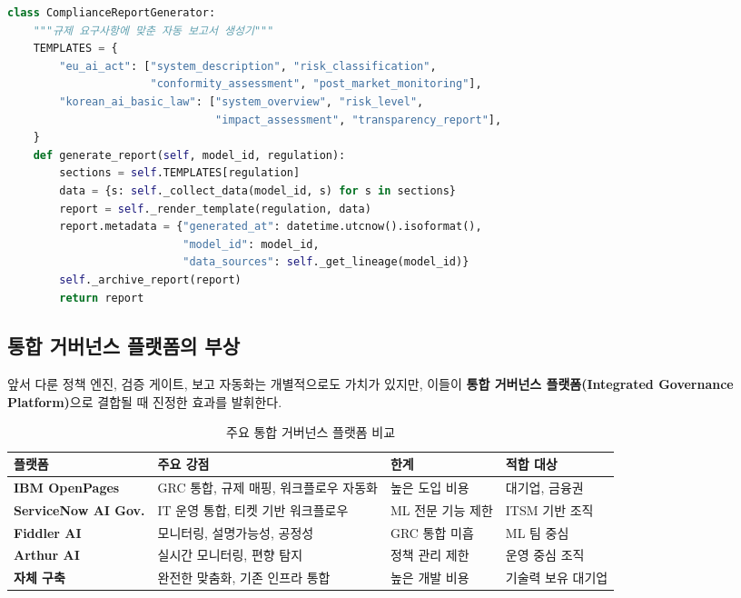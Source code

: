 \begin{lstlisting}[language=Python, caption={규정 준수 보고서 자동 생성기}, label={lst:compliance_report}]
class ComplianceReportGenerator:
    """규제 요구사항에 맞춘 자동 보고서 생성기"""
    TEMPLATES = {
        "eu_ai_act": ["system_description", "risk_classification",
                      "conformity_assessment", "post_market_monitoring"],
        "korean_ai_basic_law": ["system_overview", "risk_level",
                                "impact_assessment", "transparency_report"],
    }
    def generate_report(self, model_id, regulation):
        sections = self.TEMPLATES[regulation]
        data = {s: self._collect_data(model_id, s) for s in sections}
        report = self._render_template(regulation, data)
        report.metadata = {"generated_at": datetime.utcnow().isoformat(),
                           "model_id": model_id,
                           "data_sources": self._get_lineage(model_id)}
        self._archive_report(report)
        return report
\end{lstlisting}

\subsection{통합 거버넌스 플랫폼의 부상}
\label{sec:14.4.4}

앞서 다룬 정책 엔진, 검증 게이트, 보고 자동화는 개별적으로도 가치가 있지만, 이들이 \textbf{통합 거버넌스 플랫폼(Integrated Governance Platform)}으로 결합될 때 진정한 효과를 발휘한다\cite{shankar2022operationalizing}.

\begin{table}[htbp]
\centering
\caption{주요 통합 거버넌스 플랫폼 비교}
\label{tab:14_platforms}
\begin{tabularx}{\textwidth}{lXXl}
\toprule
\textbf{플랫폼} & \textbf{주요 강점} & \textbf{한계} & \textbf{적합 대상} \\
\midrule
\textbf{IBM OpenPages} & GRC 통합, 규제 매핑, 워크플로우 자동화 & 높은 도입 비용 & 대기업, 금융권 \\
\textbf{ServiceNow AI Gov.} & IT 운영 통합, 티켓 기반 워크플로우 & ML 전문 기능 제한 & ITSM 기반 조직 \\
\textbf{Fiddler AI} & 모니터링, 설명가능성, 공정성 & GRC 통합 미흡 & ML 팀 중심 \\
\textbf{Arthur AI} & 실시간 모니터링, 편향 탐지 & 정책 관리 제한 & 운영 중심 조직 \\
\textbf{자체 구축} & 완전한 맞춤화, 기존 인프라 통합 & 높은 개발 비용 & 기술력 보유 대기업 \\
\bottomrule
\end{tabularx}
\end{table}

